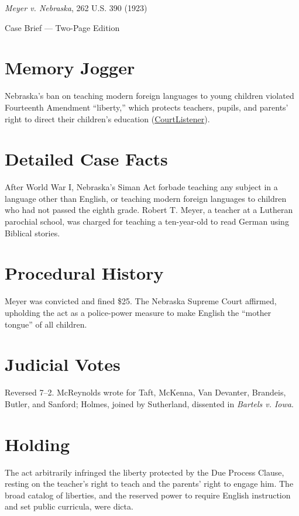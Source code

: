 \documentclass[12pt]{article}
\begin{document}
\begin{center}
{\LARGE \textit{Meyer v. Nebraska}, 262 U.S. 390 (1923)\par}
\vspace{0.5em}
{\large Case Brief --- Two-Page Edition\par}
\end{center}

\section{Memory Jogger}
Nebraska's ban on teaching modern foreign languages to young children violated Fourteenth Amendment ``liberty,'' which protects teachers, pupils, and parents' right to direct their children's education (\href{https://www.courtlistener.com/opinion/100233/meyer-v-nebraska/}{CourtListener}).

\section{Detailed Case Facts}
After World War I, Nebraska's Siman Act forbade teaching any subject in a language other than English, or teaching modern foreign languages to children who had not passed the eighth grade. Robert T. Meyer, a teacher at a Lutheran parochial school, was charged for teaching a ten-year-old to read German using Biblical stories.

\section{Procedural History}
Meyer was convicted and fined \$25. The Nebraska Supreme Court affirmed, upholding the act as a police-power measure to make English the ``mother tongue'' of all children.

\section{Judicial Votes}
Reversed 7--2. McReynolds wrote for Taft, McKenna, Van Devanter, Brandeis, Butler, and Sanford; Holmes, joined by Sutherland, dissented in \textit{Bartels v. Iowa}.

\section{Holding}
The act arbitrarily infringed the liberty protected by the Due Process Clause, resting on the teacher's right to teach and the parents' right to engage him. The broad catalog of liberties, and the reserved power to require English instruction and set public curricula, were dicta.
\end{document}
